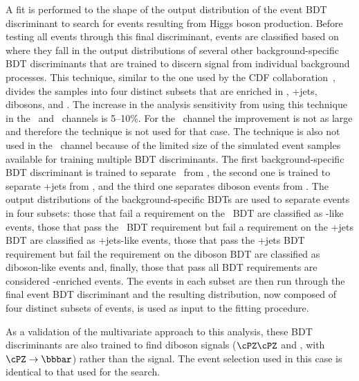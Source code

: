 \documentclass[11pt,twoside,a4paper,cmspaper,final,collab]{cms-tdr}
\begin{document}
A fit is performed to the shape of the output distribution of the event BDT discriminant
to search for events resulting from Higgs boson production. Before testing all
events through this
final discriminant, events are classified based
on where they fall in the output distributions of several other background-specific BDT discriminants
that are trained to discern signal from individual background processes. This
technique, similar to the one used by the CDF collaboration~\cite{Aaltonen:2012id}, divides the samples into four distinct subsets that are
enriched in \ttbar, {\Vvar}+jets, dibosons, and \VH. The increase in the analysis sensitivity from using this technique in the
 \ZnnH\ and \WlnH\ channels is 5--10\%. For the  \ZllH\ channel the
improvement is not as large and therefore the technique is not used for that
 case. The technique is also not used in the \WtnH\ channel because of the
 limited size of the simulated event samples available for training
 multiple BDT discriminants.
The first background-specific BDT discriminant is trained to separate
\ttbar\ from \VH,
the second one is trained to separate {\Vvar}+jets from \VH, and the third one separates diboson events from \VH.
The output distributions of the background-specific BDTs are used to separate
events in four subsets: those that fail a requirement on the \ttbar\ BDT
are classified as \ttbar-like events,
those that pass the \ttbar\ BDT requirement but fail a requirement on the {\Vvar}+jets BDT
are classified as {\Vvar}+jets-like events,
those that pass the {\Vvar}+jets BDT requirement but fail the requirement on the diboson BDT
are classified as diboson-like events
and, finally, those that pass all BDT requirements are considered \VH-enriched events.
The events in each subset are then run through the final event BDT
discriminant and the resulting distribution, now composed of four
distinct subsets of events, is used as input to the fitting procedure.


As a validation of the multivariate approach to this analysis, these
BDT discriminants are also trained to find diboson signals ($\cPZ\cPZ$ and \PW\cPZ, with
$\cPZ\to \bbbar$) rather than the \VH signal. The event selection used in this case is identical
to that used for the \VH search.
\end{document}

